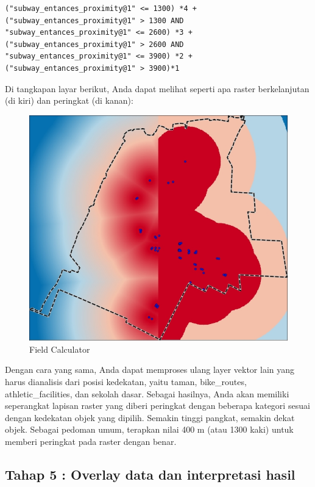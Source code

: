 \documentclass[]{book}
\begin{document}
\begin{verbatim}
("subway_entances_proximity@1" <= 1300) *4 + ("subway_entances_proximity@1" > 1300 AND "subway_entances_proximity@1" <= 2600) *3 + ("subway_entances_proximity@1" > 2600 AND "subway_entances_proximity@1" <= 3900) *2 + ("subway_entances_proximity@1" > 3900)*1
\end{verbatim}

Di tangkapan layar berikut, Anda dapat melihat seperti apa raster berkelanjutan (di kiri) dan peringkat (di kanan):

\begin{figure}

{\centering \includegraphics[width=0.7\linewidth]{images/04/fig39} 

}

\caption{Field Calculator}\label{fig:fig1439}
\end{figure}

Dengan cara yang sama, Anda dapat memproses ulang layer vektor lain yang harus dianalisis dari posisi kedekatan, yaitu taman, bike\_routes, athletic\_facilities, dan sekolah dasar. Sebagai hasilnya, Anda akan memiliki seperangkat lapisan raster yang diberi peringkat dengan beberapa kategori sesuai dengan kedekatan objek yang dipilih. Semakin tinggi pangkat, semakin dekat objek. Sebagai pedoman umum, terapkan nilai 400 m (atau 1300 kaki) untuk memberi peringkat pada raster dengan benar.

\hypertarget{tahap-5-overlay-data-dan-interpretasi-hasil}{%
\subsection{Tahap 5 : Overlay data dan interpretasi hasil}\label{tahap-5-overlay-data-dan-interpretasi-hasil}}
\end{document}
